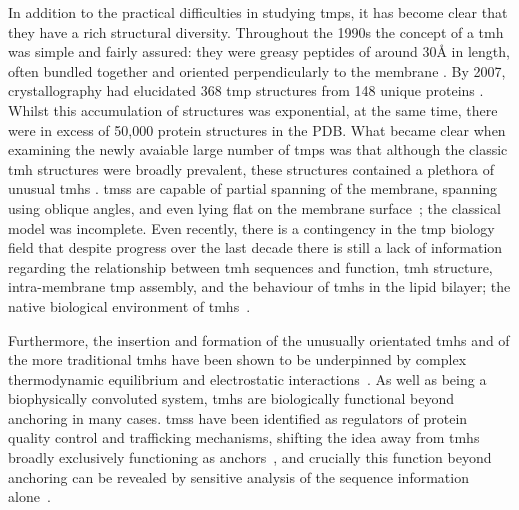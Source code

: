 In addition to the practical difficulties in studying \gls{tmp}s, it has become clear that they have a rich structural diversity.
Throughout the 1990s the concept of a \gls{tmh} was simple and fairly assured: they were greasy peptides of around 30{\AA} in length, often bundled together and oriented perpendicularly to the membrane \cite{VonHeijne2006}.
By 2007, crystallography had elucidated 368 \gls{tmp} structures from 148 unique proteins \cite{Carpenter2008}.
Whilst this accumulation of structures was exponential, at the same time, there were in excess of 50,000 protein structures in the PDB.
What became clear when examining the newly avaiable large number of \gls{tmp}s was that although the classic \gls{tmh} structures were broadly prevalent, these structures contained a plethora of unusual \gls{tmh}s \cite{VonHeijne2006}.
\gls{tms}s are capable of partial spanning of the membrane, spanning using oblique angles, and even lying flat on the membrane surface~\cite{VonHeijne2006, Elofsson2007}; the classical model was incomplete.
Even recently, there is a contingency in the  \gls{tmp} biology field that despite progress over the last decade there is still a lack of information regarding the relationship between \gls{tmh} sequences and function, \gls{tmh} structure, intra-membrane \gls{tmp} assembly, and the behaviour of \gls{tmh}s in the lipid bilayer; the native biological environment of \gls{tmh}s~\cite{Ladokhin2015}.

Furthermore, the insertion and formation of the unusually orientated \gls{tmh}s and of the more traditional \gls{tmh}s have been shown to be underpinned by complex thermodynamic equilibrium and electrostatic interactions~\cite{Cymer2015, Elisa2012, Ismail2015}.
As well as being a biophysically convoluted system, \gls{tmh}s are biologically functional beyond anchoring in many cases.
\gls{tms}s have been identified as regulators of protein quality control and trafficking mechanisms, shifting the idea away from \gls{tmh}s broadly exclusively functioning as anchors~\cite{Hessa2011}, and crucially this function beyond anchoring can be revealed by sensitive analysis of the sequence information alone~\cite{Wong2011, Wong2012}.

